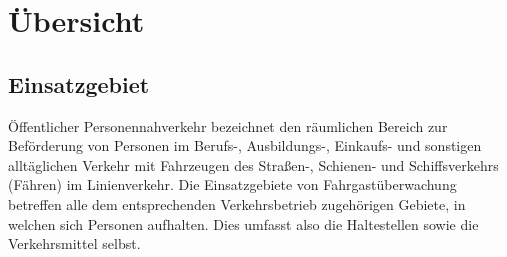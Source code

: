 \section{Übersicht}
\subsection{Einsatzgebiet} %
Öffentlicher Personennahverkehr bezeichnet den \glqq{}räumlichen Bereich zur Beförderung von Personen im Berufs-,
Ausbildungs-, Einkaufs- und sonstigen alltäglichen Verkehr mit Fahrzeugen des Straßen-, Schienen- und Schiffsverkehrs (Fähren) im Linienverkehr.
\grqq{} \cite{Dr.FriedrichvonStackelbergDr.RobertMalina.2018}
Die Einsatzgebiete von Fahrgastüberwachung betreffen alle dem entsprechenden Verkehrsbetrieb zugehörigen Gebiete, in welchen sich Personen aufhalten.
Dies umfasst also die Haltestellen sowie die Verkehrsmittel selbst.



